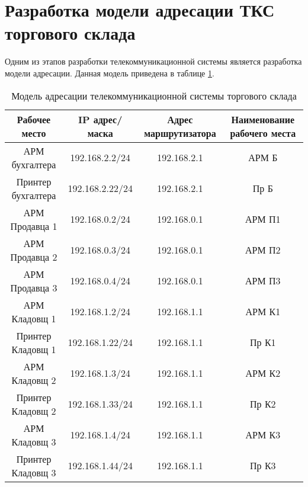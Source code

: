 \section{Разработка модели адресации ТКС торгового склада}
\label{sec:4}
Одним из этапов разработки телекоммуникационной системы является разработка модели адресации. Данная модель приведена в таблице \ref{tab:model}.

\begin{table}[H]
  \centering
  \caption{Модель адресации телекоммуникационной системы торгового склада}
  \begin{tabular}{|c|c|c|c|} \hline
    Рабочее место & IP адрес/маска & Адрес маршрутизатора & Наименование рабочего места \\ \hline
    АРМ бухгалтера & 192.168.2.2/24 & 192.168.2.1 & АРМ Б \\ \hline
    Принтер бухгалтера & 192.168.2.22/24 & 192.168.2.1 & Пр Б \\ \hline
    АРМ Продавца 1 & 192.168.0.2/24 & 192.168.0.1 & АРМ П1 \\ \hline
    АРМ Продавца 2 & 192.168.0.3/24 & 192.168.0.1 & АРМ П2 \\ \hline
    АРМ Продавца 3 & 192.168.0.4/24 & 192.168.0.1 & АРМ П3 \\ \hline
    АРМ Кладовщ 1 & 192.168.1.2/24 & 192.168.1.1 & АРМ К1 \\ \hline
    Принтер Кладовщ 1 & 192.168.1.22/24 & 192.168.1.1 & Пр К1 \\ \hline
    АРМ Кладовщ 2 & 192.168.1.3/24 & 192.168.1.1 & АРМ К2 \\ \hline
    Принтер Кладовщ 2 & 192.168.1.33/24 & 192.168.1.1 & Пр К2 \\ \hline
    АРМ Кладовщ 3 & 192.168.1.4/24 & 192.168.1.1 & АРМ К3 \\ \hline
    Принтер Кладовщ 3 & 192.168.1.44/24 & 192.168.1.1 & Пр К3 \\ \hline
  \end{tabular}
  \label{tab:model}
\end{table}
